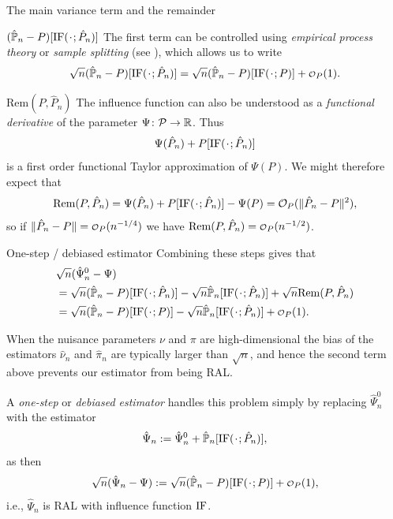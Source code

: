 \documentclass[handout]{beamer}\usepackage{listings}
\begin{document}
\begin{frame}[label={sec:org06891ca}]{The main variance term and the remainder}
\small
\begin{block}{\((\empmeas-P)[\ic(\blank; \hat{P}_n)]\)}
The first term can be controlled using \emph{empirical process theory} or \emph{sample splitting} (see
\cite{kennedy2022semiparametric}), which allows us to write \[ \sqrt{n}(\empmeas-P)[\ic(\blank;
\hat P_n)] = \sqrt{n}(\empmeas-P)[\ic(\blank; P)] + \smallO_P(1).\]
\end{block}

\begin{block}{\(\mathrm{Rem}(P, \hat{P}_n)\)}
The influence function can also be understood as a \emph{functional derivative} of the parameter
\(\Psi\colon \mathcal{P} \rightarrow \mathbb{R}\). Thus \[\Psi(\hat P_n) + P[\ic(\blank; \hat{P}_n)]\] is a
first order functional Taylor approximation of \(\Psi(P)\). We might therefore expect that \[
\mathrm{Rem}(P, \hat{P}_n) = \Psi(\hat P_n) + P[\ic(\blank; \hat{P}_n)] - \Psi(P) = \mathcal{O}_P(\|
\hat{P}_n -P \|^2), \] so if \(\| \hat{P}_n -P \| = \smallO_P(n^{-1/4})\) we have \(\mathrm{Rem}(P,
\hat{P}_n) = \smallO_P(n^{-1/2})\).
\end{block}
\end{frame}

\begin{frame}[label={sec:org88c6806}]{One-step / debiased estimator}
\small
Combining these steps gives that
\begin{align*}
  & \sqrt{n}(\hat{\Psi}_n^0 - \Psi) 
  \\
    &  = \sqrt{n}(\empmeas-P)[\ic(\blank; \hat{P}_n)]
    - \sqrt{n}\empmeas[\ic(\blank; \hat{P}_n)]
    + \sqrt{n}\mathrm{Rem}(P,  \hat{P}_n)
    \\
    & =
    \sqrt{n}(\empmeas-P)[\ic(\blank; P)]
    - \sqrt{n}\empmeas[\ic(\blank; \hat{P}_n)]
    + \smallO_P(1).
\end{align*}

When the nuisance parameters \(\nu\) and \(\pi\) are high-dimensional the bias of the estimators
\(\hat{\nu}_n\) and \(\hat{\pi}_n\) are typically larger than \(\sqrt{n}\), and hence the second term
above prevents our estimator from being RAL.

\vfill

A \emph{one-step} or \emph{debiased estimator} handles this problem simply by replacing \(\hat\Psi_n^0\) with
the estimator \[\hat\Psi_n:= \hat\Psi_n^0 + \empmeas[\ic(\blank; \hat{P}_n)],\] as then \[\sqrt n
(\hat\Psi_n - \Psi):= \sqrt{n}(\empmeas-P)[\ic(\blank; P)] + \smallO_P(1),\] i.e., \(\hat\Psi_n\) is
RAL with influence function \(\mathrm{IF}\).
\end{frame}
\end{document}
